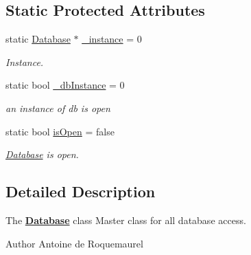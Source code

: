 \subsection*{Static Protected Attributes}
\begin{DoxyCompactItemize}
\item 
\hypertarget{classDatabase_1_1Database_a45c615cdb03c353a52dcb1a9fffc2393}{static \hyperlink{classDatabase_1_1Database}{Database} $\ast$ \hyperlink{classDatabase_1_1Database_a45c615cdb03c353a52dcb1a9fffc2393}{\+\_\+instance} = 0}\label{classDatabase_1_1Database_a45c615cdb03c353a52dcb1a9fffc2393}

\begin{DoxyCompactList}\small\item\em Instance. \end{DoxyCompactList}\item 
\hypertarget{classDatabase_1_1Database_ae14d34aebe8f014c101d9fdc0cdb0daf}{static bool \hyperlink{classDatabase_1_1Database_ae14d34aebe8f014c101d9fdc0cdb0daf}{\+\_\+db\+Instance} = 0}\label{classDatabase_1_1Database_ae14d34aebe8f014c101d9fdc0cdb0daf}

\begin{DoxyCompactList}\small\item\em an instance of db is open \end{DoxyCompactList}\item 
\hypertarget{classDatabase_1_1Database_a7d0456fa60dffbdf454efdb5288b7a0f}{static bool \hyperlink{classDatabase_1_1Database_a7d0456fa60dffbdf454efdb5288b7a0f}{is\+Open} = false}\label{classDatabase_1_1Database_a7d0456fa60dffbdf454efdb5288b7a0f}

\begin{DoxyCompactList}\small\item\em \hyperlink{classDatabase_1_1Database}{Database} is open. \end{DoxyCompactList}\end{DoxyCompactItemize}


\subsection{Detailed Description}
The {\bfseries \hyperlink{classDatabase_1_1Database}{Database}} class Master class for all database access. 

\begin{DoxyAuthor}{Author}
Antoine de Roquemaurel 
\end{DoxyAuthor}


